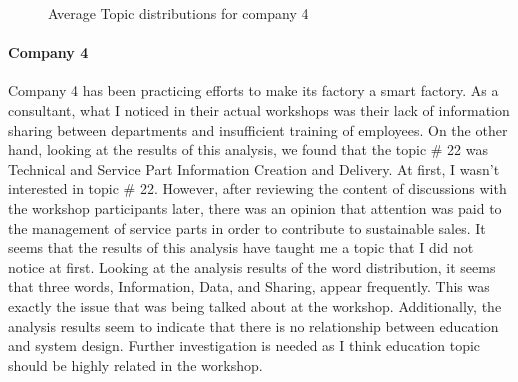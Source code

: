 \documentclass[senior]{IPSstyle}
\begin{document}
\begin{figure}[h]
    \begin{center}
    \end{center}
\vspace{-0.3cm}
    \caption{Average Topic distributions for company 4}
    \label{fig_c4}
    \vspace{-0.3cm}
\end{figure} 

\paragraph{Company 4} Company 4 has been practicing efforts to make its factory a smart factory. As a consultant, what I noticed in their actual workshops was their lack of information sharing between departments and insufficient training of employees. On the other hand, looking at the results of this analysis, we found that the topic \# 22 was Technical and Service Part Information Creation and Delivery. At first, I wasn’t interested in topic \# 22. However, after reviewing the content of discussions with the workshop participants later, there was an opinion that attention was paid to the management of service parts in order to contribute to sustainable sales. It seems that the results of this analysis have taught me a topic that I did not notice at first. Looking at the analysis results of the word distribution, it seems that three words, Information, Data, and Sharing, appear frequently. This was exactly the issue that was being talked about at the workshop. Additionally, the analysis results seem to indicate that there is no relationship between education and system design. Further investigation is needed as I think education topic should be highly related in the workshop.
\bigskip
\end{document}
